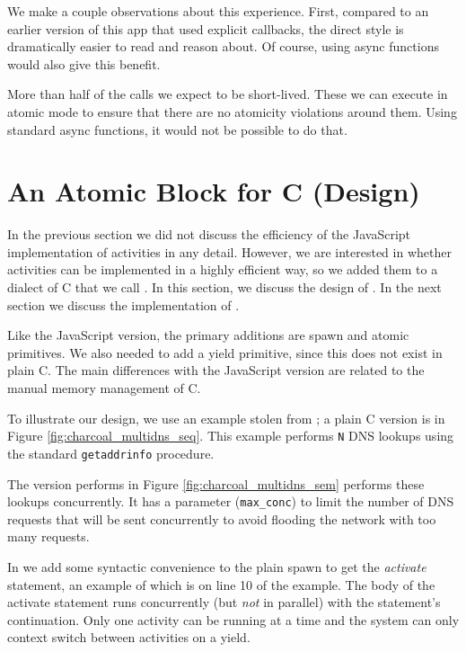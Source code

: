 \documentclass[sigplan,10pt,review,anonymous]{acmart}\settopmatter{printfolios=true,printccs=false,printacmref=false}
\begin{document}
We make a couple observations about this experience.
First, compared to an earlier version of this app that used explicit callbacks, the direct style is dramatically easier to read and reason about.
Of course, using async functions would also give this benefit.

More than half of the calls we expect to be short-lived.
These we can execute in atomic mode to ensure that there are no atomicity violations around them.
Using standard async functions, it would not be possible to do that.

\section{An Atomic Block for C (Design)}

In the previous section we did not discuss the efficiency of the JavaScript implementation of activities in any detail.
However, we are interested in whether activities can be implemented in a highly efficient way, so we added them to a dialect of C that we call \charcoal{}.
In this section, we discuss the design of \charcoal{}.
In the next section we discuss the implementation of \charcoal{}.

Like the JavaScript version, the primary additions are spawn and atomic primitives.
We also needed to add a yield primitive, since this does not exist in plain C.
The main differences with the JavaScript version are related to the manual memory management of C.

To illustrate our design, we use an example stolen from \cite{Krohn2007}; a plain C version is in Figure \ref{fig:charcoal_multidns_seq}.
This example performs \texttt{N} DNS lookups using the standard \texttt{getaddrinfo} procedure.

The \charcoal{} version performs in Figure \ref{fig:charcoal_multidns_sem} performs these lookups concurrently.
It has a parameter (\texttt{max\_conc}) to limit the number of DNS requests that will be sent concurrently to avoid flooding the network with too many requests.

In \charcoal{} we add some syntactic convenience to the plain spawn to get the \emph{activate} statement, an example of which is on line 10 of the example.
The body of the activate statement runs concurrently (but \emph{not} in parallel) with the statement's continuation.
Only one activity can be running at a time and the system can only context switch between activities on a yield.
\end{document}
